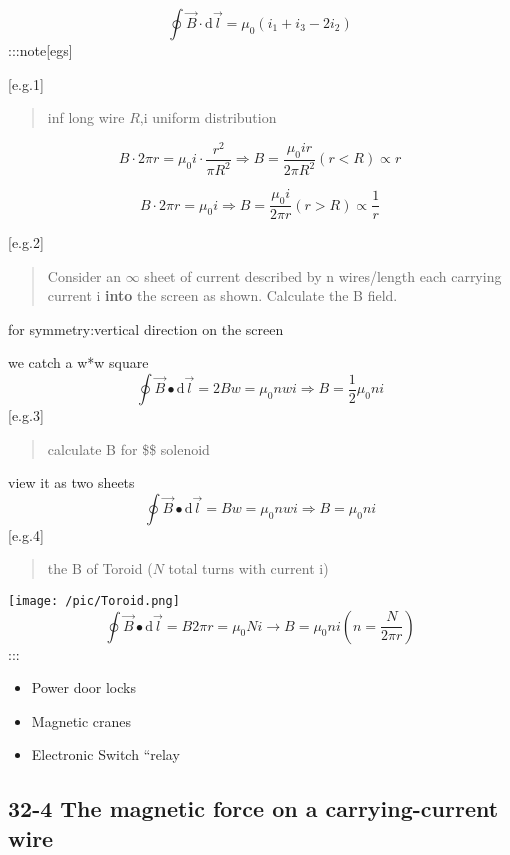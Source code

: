 \documentclass[
]{article}
\begin{document}
\[
\oint \vec B\cdot \mathrm d\vec l=\mu_0(i_1+i_3-2i_2)
\] :::note{[}egs{]}

{[}e.g.1{]}

\begin{quote}
inf long wire \(R\),i uniform distribution
\end{quote}

\[
B\cdot 2\pi r=\mu_0i\cdot \frac{r^2}{\pi R^2}\Rightarrow B=\frac{\mu_0 i r}{2\pi R^2}(r<R)\propto r
\]

\[
B\cdot 2\pi r=\mu_0i\Rightarrow B=\frac{\mu_0 i }{2\pi r}(r>R)\propto \frac{1}{r}
\]

{[}e.g.2{]}

\begin{quote}
Consider an \(\infty\)\hspace{0pt} sheet of current described by n
wires/length each carrying current i \textbf{into} the screen as shown.
Calculate the B field.
\end{quote}

for symmetry:vertical direction on the screen

we catch a w*w square \[
\oint \vec B \bullet \mathrm d\vec  l=2Bw=\mu_0 n w i\Rightarrow B=\frac{1}{2}\mu_0 ni
\] {[}e.g.3{]}

\begin{quote}
calculate B for \$\infty \$\hspace{0pt} solenoid
\end{quote}

view it as two sheets \[
\oint \vec B\bullet \mathrm d \vec l =Bw=\mu _0 n w i\Rightarrow B=\mu_0 ni
\] {[}e.g.4{]}

\begin{quote}
the B of Toroid (\(N\) total turns with current i)
\end{quote}

\texttt{[image: /pic/Toroid.png]} \[
\oint \vec B\bullet \mathrm d \vec l=B2\pi r=\mu_0Ni\to B=\mu _0ni(n=\frac{N}{2\pi r})
\] :::

\begin{itemize}
\item
  Power door locks
\item
  Magnetic cranes
\item
  Electronic Switch ``relay
\end{itemize}

\hypertarget{the-magnetic-force-on-a-carrying-current-wire}{%
\subsection{32-4 The magnetic force on a carrying-current
wire}\label{the-magnetic-force-on-a-carrying-current-wire}}
\end{document}
